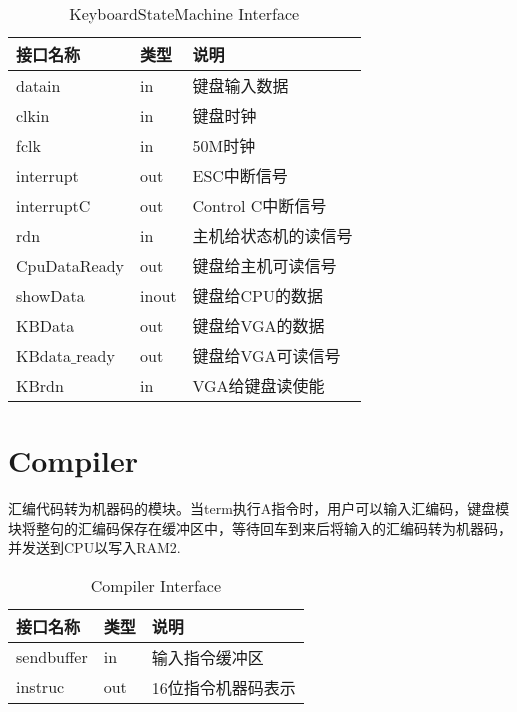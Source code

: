 \begin{center}
\renewcommand{\arraystretch}{1.3}
\small
\begin{longtable}{|p{3cm}<{\centering}|p{1.4cm}<{\centering}|p{7cm}<{\centering}|}
\caption{KeyboardStateMachine Interface}
\label{tab:treatments}\\
\hline
接口名称 & 类型 & 说明 \\
\hline
datain & in & 键盘输入数据 \\
\hline
clkin & in & 键盘时钟 \\
\hline
fclk & in & 50M时钟 \\
\hline
interrupt & out & ESC中断信号 \\
\hline
interruptC & out & Control C中断信号 \\
\hline
rdn & in & 主机给状态机的读信号 \\
\hline
CpuDataReady & out & 键盘给主机可读信号 \\
\hline
showData & inout & 键盘给CPU的数据 \\
\hline
KBData & out & 键盘给VGA的数据\\
\hline
KBdata$\_$ready & out & 键盘给VGA可读信号\\
\hline
KBrdn & in & VGA给键盘读使能 \\
\hline
\end{longtable}
\end{center}


\section{Compiler}

汇编代码转为机器码的模块。当term执行A指令时，用户可以输入汇编码，键盘模块将整句的汇编码保存在缓冲区中，等待回车到来后将输入的汇编码转为机器码，并发送到CPU以写入RAM2.

\begin{center}
\renewcommand{\arraystretch}{1.3}
\small
\begin{longtable}{|p{3cm}<{\centering}|p{1.4cm}<{\centering}|p{7cm}<{\centering}|}
\caption{Compiler Interface}
\label{tab:treatments}\\
\hline
接口名称 & 类型 & 说明 \\
\hline
sendbuffer & in & 输入指令缓冲区 \\
\hline
instruc & out & 16位指令机器码表示 \\
\hline
\end{longtable}
\end{center}

